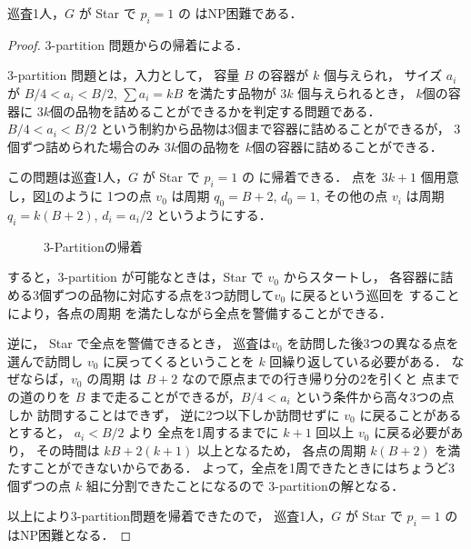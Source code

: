 \begin{theo}
	巡査1人，$G$ が Star で $p_i = 1$ の \maxprofit はNP困難である．
\end{theo}
\begin{proof}
3-partition 問題からの帰着による．

3-partition 問題とは，入力として，
容量 $B$ の容器が $k$ 個与えられ，
サイズ $a_i$ が $B/4 < a_i < B/2$, $\sum a_i = kB$ を満たす品物が $3k$ 個与えられるとき，
$k$個の容器に $3k$個の品物を詰めることができるかを判定する問題である．
$B/4 < a_i < B/2$ という制約から品物は3個まで容器に詰めることができるが，
3個ずつ詰められた場合のみ $3k$個の品物を $k$個の容器に詰めることができる．

この問題は巡査1人，$G$ が Star で $p_i = 1$ の \maxprofit に帰着できる．
点を $3k + 1$ 個用意し，図\ref{fig:star3partitionNPhard}のように
1つの点 $v_0$ は周期 $q_0 = B + 2$, $d_0 = 1$, 
その他の点 $v_i$ は周期 $q_i = k(B + 2)$, $d_i = a_i/2$ というようにする．

\begin{figure}
	\centering
	\caption{3-Partitionの帰着 \label{fig:star3partitionNPhard}}
\end{figure}

すると，3-partition が可能なときは，Star で $v_0$ からスタートし，
各容器に詰める3個ずつの品物に対応する点を3つ訪問して$v_0$ に戻るという巡回を
することにより，各点の周期 を満たしながら全点を警備することができる．

逆に， Star で全点を警備できるとき，
巡査は$v_0$ を訪問した後3つの異なる点を選んで訪問し $v_0$ に戻ってくるということを
$k$ 回繰り返している必要がある．
なぜならば，$v_0$ の周期 は $B + 2$ なので原点までの行き帰り分の2を引くと
点までの道のりを $B$ まで走ることができるが，$B/4 < a_i$ という条件から高々3つの点しか
訪問することはできず，
逆に2つ以下しか訪問せずに $v_0$ に戻ることがあるとすると， $a_i < B/2$ より
全点を1周するまでに $k + 1$ 回以上 $v_0$ に戻る必要があり，
その時間は $kB + 2(k + 1)$ 以上となるため，
各点の周期 $k(B + 2)$ を満たすことができないからである．
よって，全点を1周できたときにはちょうど3個ずつの点 $k$ 組に分割できたことになるので
3-partitionの解となる．

以上により3-partition問題を帰着できたので，
巡査1人，$G$ が Star で $p_i = 1$ の \maxprofit はNP困難となる．
\end{proof}




